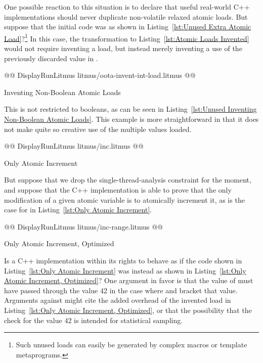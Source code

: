 \documentclass[10]{article}
\begin{document}
One possible reaction to this situation is to declare that useful
real-world C++ implementations should never duplicate non-volatile
relaxed atomic loads.
But suppose that the initial code was as shown in
Listing~\ref{lst:Unused Extra Atomic Load}?\footnote{
	Such unused loads can easily be generated by complex macros or
	template metaprograms.}
In this case, the transformation to
Listing~\ref{lst:Atomic Loads Invented}
would not require inventing a load, but instead merely inventing a use of
the previously discarded value in .

\begin{listing}[tbp]
@@ DisplayRunLitmus litmus/oota-invent-int-load.litmus @@
\caption{Inventing Non-Boolean Atomic Loads}
\label{lst:Unused Inventing Non-Boolean Atomic Loads}
\end{listing}

This is not restricted to booleans, as can be seen in
Listing~\ref{lst:Unused Inventing Non-Boolean Atomic Loads}.
This example is more straightforward in that it does not make quite so
creative use of the multiple values loaded.

\begin{listing}[tbp]
@@ DisplayRunLitmus litmus/inc.litmus @@
\caption{Only Atomic Increment}
\label{lst:Only Atomic Increment}
\end{listing}

But suppose that we drop the single-thread-analysis constraint for
the moment, and suppose that the C++ implementation is able to prove
that the only modification of a given atomic variable is to atomically
increment it, as is the case for  in
Listing~\ref{lst:Only Atomic Increment}.

\begin{listing}[tbp]
@@ DisplayRunLitmus litmus/inc-range.litmus @@
\caption{Only Atomic Increment, Optimized}
\label{lst:Only Atomic Increment, Optimized}
\end{listing}

Is a C++ implementation within its rights to behave as if the code
shown in
Listing~\ref{lst:Only Atomic Increment}
was instead as shown in
Listing~\ref{lst:Only Atomic Increment, Optimized}?
One argument in favor is that the value of  must have
passed through the value 42 in the case where  and 
bracket that value.
Arguments against might cite the added overhead of the invented load
in Listing~\ref{lst:Only Atomic Increment, Optimized}, or that the
possibility that the check for the value 42 is intended for statistical
sampling.
\end{document}
